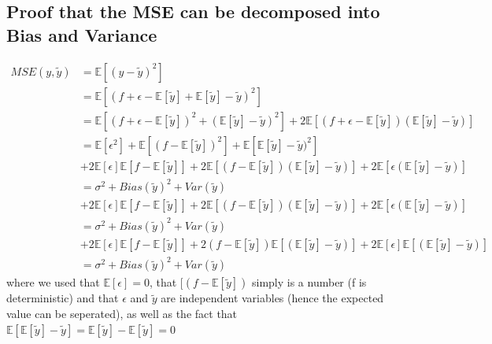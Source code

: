 \documentclass[11pt,a4paper,titlepage]{article}
\begin{document}
\subsection{Proof that the MSE can be decomposed into Bias and Variance}
\begin{equation}\label{Proof}
\begin{split}
MSE(y,\tilde y) & =\mathbb{E}\left[({y}-{\tilde y})^2  \right] \\
&= \mathbb{E}\left[({f}+{\epsilon}-\mathbb{E}\left[\tilde y\right]+\mathbb{E}\left[\tilde y\right]-{\tilde y})^2  \right]\\
&= \mathbb{E}\left[(f+\epsilon- \mathbb{E}\left[\tilde y\right])^2+(\mathbb{E}\left[\tilde y\right]-{\tilde y})^2 \right]+2\mathbb{E}\left[(f+\epsilon-\mathbb{E}\left[\tilde y\right])(\mathbb{E}\left[\tilde y\right]-\tilde y)\right]\\
&= \mathbb{E}\left[\epsilon^2\right]+\mathbb{E}\left[(f-\mathbb{E}\left[\tilde y\right])^2\right]+\mathbb{E}\left[ \mathbb{E}\left[\tilde y\right]-\tilde y)^2\right]\\   & +2\mathbb{E}\left[\epsilon\right]\mathbb{E}\left[f-\mathbb{E}\left[\tilde y\right]\right]+2\mathbb{E}\left[(f-\mathbb{E}\left[\tilde y\right])(\mathbb{E}\left[\tilde y\right]-\tilde y)\right] +2\mathbb{E}\left[\epsilon (\mathbb{E}\left[\tilde y\right]-\tilde y)\right] \\ 
&=\sigma^2+Bias(\tilde y)^2+Var(\tilde y) \\ &
+2\mathbb{E}\left[\epsilon\right]\mathbb{E}\left[f-\mathbb{E}\left[\tilde y\right]\right]+2\mathbb{E}\left[(f-\mathbb{E}\left[\tilde y\right])(\mathbb{E}\left[\tilde y\right]-\tilde y)\right] +2\mathbb{E}\left[\epsilon (\mathbb{E}\left[\tilde y\right]-\tilde y)\right] \\
&=\sigma^2+Bias(\tilde y)^2+Var(\tilde y) \\ &
+2\mathbb{E}\left[\epsilon\right]\mathbb{E}\left[f-\mathbb{E}\left[\tilde y\right]\right]+2(f-\mathbb{E}\left[\tilde y\right])\mathbb{E}\left[(\mathbb{E}\left[\tilde y\right]-\tilde y)\right] +2\mathbb{E}\left[\epsilon\right]\mathbb{E}\left[ (\mathbb{E}\left[\tilde y\right]-\tilde y)\right]\\
&=\sigma^2+Bias(\tilde y)^2+Var(\tilde y)
\end{split}
\end{equation}
where we used that $\mathbb{E}\left[\epsilon\right]=0$, that $[(f-\mathbb{E}\left[\tilde y\right])$ simply is a number (f is deterministic) and that $\epsilon$ and $\tilde y$ are independent variables (hence the expected value can be seperated), as well as the fact that $\mathbb{E}\left[\mathbb{E}\left[\tilde y\right]-\tilde y\right]=\mathbb{E}\left[\tilde y\right]-\mathbb{E}\left[\tilde y\right]=0$ 


\end{document}
